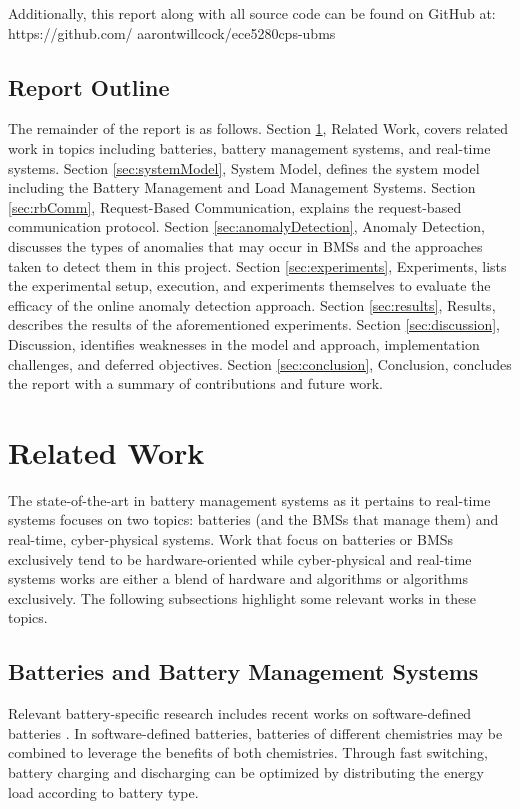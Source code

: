 \documentclass[11pt,conference,draftcls,onecolumn]{IEEEtran}
\begin{document}
Additionally, this report along with all source code can be found on GitHub at:
https://github.com/
aarontwillcock/ece5280cps-ubms

\subsection{Report Outline}
The remainder of the report is as follows.
Section \ref{sec:relatedWork}, Related Work, covers related work in topics including batteries, battery management systems, and real-time systems.
Section \ref{sec:systemModel}, System Model, defines the system model including the Battery Management and Load Management Systems.
Section \ref{sec:rbComm}, Request-Based Communication, explains the request-based communication protocol.
Section \ref{sec:anomalyDetection}, Anomaly Detection, discusses the types of anomalies that may occur in BMSs and the approaches taken to detect them in this project.
Section \ref{sec:experiments}, Experiments, lists the experimental setup, execution, and experiments themselves to evaluate the efficacy of the online anomaly detection approach.
Section \ref{sec:results}, Results, describes the results of the aforementioned experiments.
Section \ref{sec:discussion}, Discussion, identifies weaknesses in the model and approach, implementation challenges, and deferred objectives.
Section \ref{sec:conclusion}, Conclusion, concludes the report with a summary of contributions and future work. 

\section{Related Work}\label{sec:relatedWork}
The state-of-the-art in battery management systems as it pertains to real-time systems focuses on two topics: batteries (and the BMSs that manage them) and real-time, cyber-physical systems.
Work that focus on batteries or BMSs exclusively tend to be hardware-oriented while cyber-physical and real-time systems works are either a blend of hardware and algorithms or algorithms exclusively.
The following subsections highlight some relevant works in these topics.

\subsection{Batteries and Battery Management Systems}
Relevant battery-specific research includes recent works on software-defined batteries \cite{softwareDefinedBatteriesConf,softwareDefinedBatteriesJrnl}.
In software-defined batteries, batteries of different chemistries may be combined to leverage the benefits of both chemistries.
Through fast switching, battery charging and discharging can be optimized by distributing the energy load according to battery type.
\end{document}
